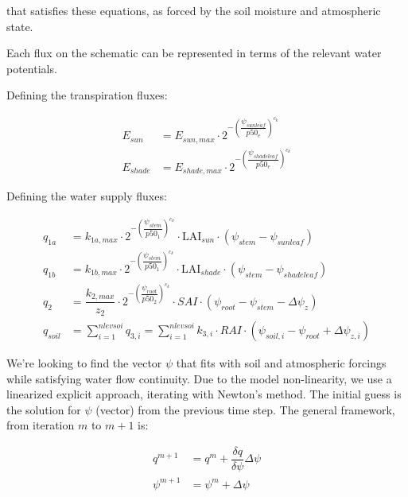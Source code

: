 \documentclass[draft,linenumbers]{agujournal}
\begin{document}
that satisfies these equations, as forced by the soil moisture and atmospheric state. 

Each flux on the schematic can be represented in terms of the relevant water potentials. 

Defining the transpiration fluxes:


   \begin{linenomath*} \begin{equation}
   \begin{aligned}
   E_{sun} &= E_{sun,max} \cdot 2^{-\left(\dfrac{\psi_{sunleaf}}{p50_e}\right)^{c_k}} \\
   E_{shade} &= E_{shade,max} \cdot 2^{-\left(\dfrac{\psi_{shadeleaf}}{p50_e}\right)^{c_k}} 
   \end{aligned}
   \end{equation} \end{linenomath*}

Defining the water supply fluxes:

   \begin{linenomath*} \begin{equation}
   \begin{aligned}
   q_{1a}&=k_{1a,max}\cdot 2^{-\left(\dfrac{\psi_{stem}}{p50_1}\right)^{c_k}} \cdot\mbox{LAI}_{sun}\cdot\left(\psi_{stem}-\psi_{sunleaf} \right) \\
   q_{1b}&=k_{1b,max}\cdot 2^{-\left(\dfrac{\psi_{stem}}{p50_1}\right)^{c_k}}\cdot\mbox{LAI}_{shade}\cdot\left(\psi_{stem}-\psi_{shadeleaf} \right) \\
   q_2&=\dfrac{k_{2,max}}{z_2} \cdot 2^{-\left(\dfrac{\psi_{root}}{p50_2}\right)^{c_k}} \cdot SAI \cdot \left( \psi_{root} - \psi_{stem} - \Delta \psi_z  \right) \\
   q_{soil}&=\sum_{i=1}^{nlevsoi}{q_{3,i}}=\sum_{i=1}^{nlevsoi}{k_{3,i}\cdot RAI\cdot\left(\psi_{soil,i}-\psi_{root} + \Delta\psi_{z,i} \right)}
   \end{aligned}
   \end{equation} \end{linenomath*}

We're looking to find the vector $\psi$
that fits with soil and atmospheric forcings while satisfying water flow continuity. 
Due to the model non-linearity, we use a linearized explicit approach, iterating with Newton's method. 
The initial guess is the solution for $\psi$ (vector) from the previous time step. 
The general framework, from iteration $m$ to $m+1$ is:

   \begin{linenomath*} \begin{equation} 
   \begin{aligned}
   q^{m+1}&=q^m+\dfrac{\delta q}{\delta\psi}\Delta\psi \\
   \psi^{m+1}&=\psi^{m}+\Delta\psi
   \end{aligned}
   \end{equation} \end{linenomath*}
\end{document}
